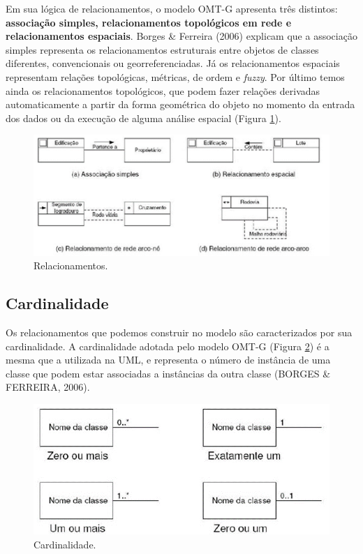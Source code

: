 		Em sua lógica de relacionamentos, o modelo OMT-G apresenta três distintos: \textbf{associação simples, relacionamentos topológicos em rede e relacionamentos espaciais}. Borges \& Ferreira (2006) explicam que a associação simples representa os relacionamentos estruturais entre objetos de classes diferentes, convencionais ou georreferenciadas. Já os relacionamentos espaciais representam relações topológicas, métricas, de ordem e \textit{fuzzy}. Por último temos ainda os relacionamentos topológicos, que podem fazer relações derivadas automaticamente a partir da forma geométrica do objeto no momento da entrada dos dados ou da execução de alguma análise espacial (Figura \ref{fig:relacionamentos}).
		
		\begin{figure} [h]
			\centering
			\includegraphics[width=1\linewidth]{data/relacionamentos}
			\caption{Relacionamentos. \cite{BORGES_etal05}}
			\label{fig:relacionamentos}
		\end{figure}
	
		\subsection{Cardinalidade}
		
		Os relacionamentos que podemos construir no modelo são caracterizados por sua cardinalidade. A cardinalidade adotada pelo modelo OMT-G (Figura \ref{fig:cardinalidade}) é a mesma que a utilizada na UML, e representa o número de instância de uma classe que podem estar associadas a instâncias da outra classe (BORGES \& FERREIRA, 2006).
		
		\begin{figure} [h]
			\centering
			\includegraphics[width=1\linewidth]{data/cardinalidade}
			\caption{Cardinalidade. \cite{BORGES_etal05}}
			\label{fig:cardinalidade}
		\end{figure}
		
